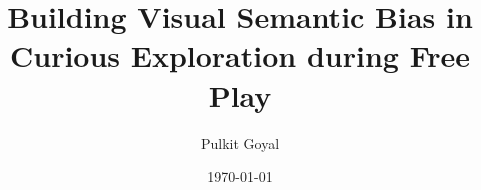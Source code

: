 \documentclass[11pt,a4paper]{report}
\title{Building Visual Semantic Bias in Curious Exploration during Free Play}
\author{Pulkit Goyal}
\date{\today}
\begin{document}



\tableofcontents
\listoffigures
\listoftables

\clearpage
{}
\pagestyle{fancy}






\pagestyle{plain}



\begin{appendices}

\end{appendices}
\end{document}

